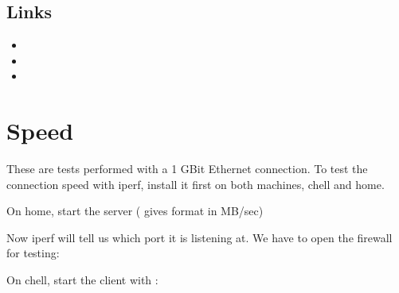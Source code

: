 \documentclass[a4paper,10pt,english]{sphinxmanual}
\begin{document}
\section{Links}
\label{\detokenize{tests:links}}\begin{itemize}
\item {} 

\item {} 

\item {} 

\end{itemize}


\chapter{Speed}
\label{\detokenize{speed:speed}}\label{\detokenize{speed::doc}}
These are tests performed with a 1 GBit Ethernet connection. To test the
connection speed with iperf, install it first on both machines, chell and home.

\begin{sphinxVerbatim}[commandchars=\\\{\}]
   
\end{sphinxVerbatim}

On home, start the server ( gives format in MB/sec)

\begin{sphinxVerbatim}[commandchars=\\\{\}]
   
\end{sphinxVerbatim}

Now iperf will tell us which port it is listening at. We have to open the
firewall for testing:

\begin{sphinxVerbatim}[commandchars=\\\{\}]
   
\end{sphinxVerbatim}

On chell, start the client with :

\begin{sphinxVerbatim}[commandchars=\\\{\}]
    
\end{sphinxVerbatim}
\end{document}
